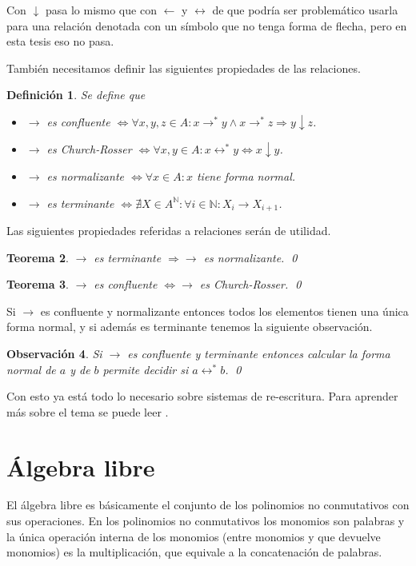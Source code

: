 \documentclass[12pt]{report}
\theoremstyle{customstyle}
\newtheorem{theorem}{Teorema}[chapter]
\newtheorem{definition}[theorem]{Definición}
\newtheorem{observation}[theorem]{Observación}
\theoremstyle{factstyle}
\begin{document}
Con $↓$ pasa lo mismo que con $←$ y $↔$ de que podría ser problemático usarla para una relación denotada con un símbolo que no tenga forma de flecha, pero en esta tesis eso no pasa.

También necesitamos definir las siguientes propiedades de las relaciones.

\begin{definition} Se define que
  \begin{itemize}
    \item $→$ es confluente $⇔ ∀x, y, z ∈ A : x →^* y ∧ x →^* z ⇒ y ↓ z$.
    \item $→$ es Church-Rosser $⇔ ∀x, y ∈ A : x ↔^* y ⇔ x ↓ y$.
    \item $→$ es normalizante $⇔ ∀x ∈ A : x$ tiene forma normal.
    \item $→$ es terminante $⇔ ∄X ∈ A^ℕ : ∀i ∈ ℕ : X_i → X_{i + 1}$.
  \end{itemize}
\end{definition}

Las siguientes propiedades referidas a relaciones serán de utilidad.

\begin{theorem}\label{thm:terminante ⇒ normalizante}
  $→$ es terminante $⇒ →$ es normalizante.
  \qed
\end{theorem}

\begin{theorem}\label{thm:confluente ⇔ Church-Rosser}
  $→$ es confluente $⇔ →$ es Church-Rosser.
  \qed
\end{theorem}

Si $→$ es confluente y normalizante entonces todos los elementos tienen una única forma normal, y si además es terminante tenemos la siguiente observación.

\begin{observation}\label{obs:→ confluente y terminante}
  Si $→$ es confluente y terminante entonces calcular la forma normal de $a$ y de $b$ permite decidir si $a ↔ ^* b$.
  \qed
\end{observation}

Con esto ya está todo lo necesario sobre sistemas de re-escritura. Para aprender más sobre el tema se puede leer \cite{book:term-rewriting}.

\section{Álgebra libre}

El álgebra libre es básicamente el conjunto de los polinomios no conmutativos con sus operaciones. En los polinomios no conmutativos los monomios son palabras y la única operación interna de los monomios (entre monomios y que devuelve monomios) es la multiplicación, que equivale a la concatenación de palabras.
\end{document}
